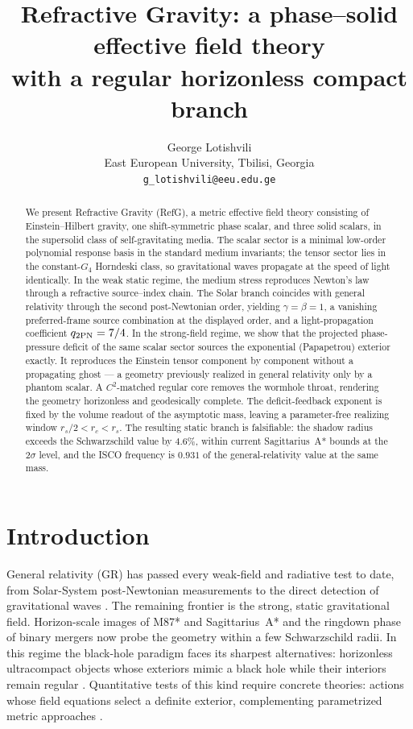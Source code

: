 \documentclass[12pt,a4paper]{article}
\title{Refractive Gravity: a phase--solid effective field theory\\
with a regular horizonless compact branch}
\author{George Lotishvili\\
\small East European University, Tbilisi, Georgia\\
\small \texttt{g\_lotishvili@eeu.edu.ge}}
\date{}
\begin{document}
\maketitle

\begin{abstract}
We present Refractive Gravity (RefG), a metric effective field theory
consisting of Einstein--Hilbert gravity, one shift-symmetric phase scalar, and
three solid scalars, in the supersolid class of self-gravitating media. The
scalar sector is a minimal low-order polynomial response basis in the standard
medium invariants; the tensor sector lies in the constant-$G_4$ Horndeski
class, so gravitational waves propagate at the speed of light identically. In
the weak static regime, the medium stress reproduces Newton's law through a
refractive source--index chain. The Solar branch coincides with general
relativity through the second post-Newtonian order, yielding $\gamma=\beta=1$,
a vanishing preferred-frame source combination at the displayed order, and a
light-propagation coefficient $q_{2{\rm PN}}=7/4$. In the strong-field regime,
we show that the projected phase-pressure deficit of the same scalar sector
sources the exponential (Papapetrou) exterior exactly. It reproduces the
Einstein tensor component by component without a propagating ghost --- a geometry
previously realized in general relativity only by a phantom scalar. A
$C^2$-matched regular core removes the wormhole throat, rendering the
geometry horizonless and geodesically complete. The deficit-feedback
exponent is fixed by the volume readout of the asymptotic mass, leaving a
parameter-free realizing window $r_s/2<r_c<r_s$. The resulting static branch
is falsifiable: the shadow radius exceeds the Schwarzschild value by
$4.6\%$, within current Sagittarius~A* bounds at the $2\sigma$ level, and the
ISCO frequency is $0.931$ of the general-relativity value at the same mass.
\end{abstract}

\section{Introduction}
\label{sec:intro}

General relativity (GR) has passed every weak-field and radiative test to
date, from Solar-System post-Newtonian measurements to the direct detection of
gravitational waves \cite{Will2014,Bertotti2003,Abbott2017GW}. The remaining
frontier is the strong, static gravitational field. Horizon-scale images of M87* and
Sagittarius~A* \cite{EHT2019M87,EHT2022SgrA} and the ringdown phase of binary
mergers now probe the geometry within a few Schwarzschild radii. In this
regime the black-hole paradigm faces its sharpest alternatives: horizonless
ultracompact objects whose exteriors mimic a black hole while their interiors
remain regular \cite{CardosoPani2019}. Quantitative tests of this kind
require concrete theories: actions whose field equations select a definite
exterior, complementing parametrized metric approaches
\cite{CliftonEtAl2012}.
\end{document}
